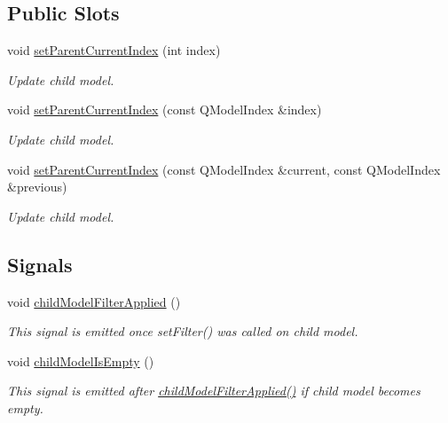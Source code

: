 \subsection*{Public Slots}
\begin{DoxyCompactItemize}
\item 
void \hyperlink{classmdt_sql_relation_a39fbecb027a5783277df1cc995485917}{set\-Parent\-Current\-Index} (int index)
\begin{DoxyCompactList}\small\item\em Update child model. \end{DoxyCompactList}\item 
void \hyperlink{classmdt_sql_relation_a4381f7f5bd39337fa5cbccf9b87ff0f6}{set\-Parent\-Current\-Index} (const Q\-Model\-Index \&index)
\begin{DoxyCompactList}\small\item\em Update child model. \end{DoxyCompactList}\item 
void \hyperlink{classmdt_sql_relation_a82a90b12bb78a4b0f9751244f134889d}{set\-Parent\-Current\-Index} (const Q\-Model\-Index \&current, const Q\-Model\-Index \&previous)
\begin{DoxyCompactList}\small\item\em Update child model. \end{DoxyCompactList}\end{DoxyCompactItemize}
\subsection*{Signals}
\begin{DoxyCompactItemize}
\item 
void \hyperlink{classmdt_sql_relation_a86656619d8156638ebfbde2b334d40e2}{child\-Model\-Filter\-Applied} ()
\begin{DoxyCompactList}\small\item\em This signal is emitted once set\-Filter() was called on child model. \end{DoxyCompactList}\item 
void \hyperlink{classmdt_sql_relation_ae30eb691c46263cb4021f55b03d0d111}{child\-Model\-Is\-Empty} ()
\begin{DoxyCompactList}\small\item\em This signal is emitted after \hyperlink{classmdt_sql_relation_a86656619d8156638ebfbde2b334d40e2}{child\-Model\-Filter\-Applied()} if child model becomes empty. \end{DoxyCompactList}\end{DoxyCompactItemize}
